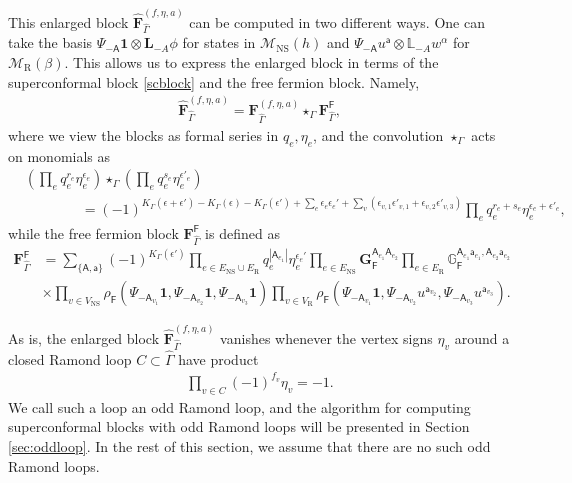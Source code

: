 \documentclass[12pt]{article}
\def\ie{\begin{equation}\begin{aligned}}
\def\fe{\end{aligned}\end{equation}}
\def\NS{\mathrm{NS}}
\def\R{\mathrm{R}}
\def\F{\mathsf{F}}
\begin{document}
This enlarged block $\widehat{\mathbf{F}}^{(f,\eta,a)}_{\hat{\Gamma}}$ can be computed in two different ways. One can take the basis $\Psi_{-\mathsf{A}}\mathbf{1}\otimes \mathbf{L}_{-A}\phi$ for states in $\mathcal{M}_\NS(h)$ and $\Psi_{-\mathsf{A}}u^{\mathsf{a}}\otimes \mathbb{L}_{-A}w^\alpha$ for $\mathcal{M}_{\R}(\beta)$. This allows us to express the enlarged block in terms of the superconformal block \eqref{scblock} and the free fermion block. Namely,
\ie \label{FconvF}
\widehat{\mathbf{F}}_{\hat{\Gamma}}^{(f,\eta,a)} = \mathbf{F}_{\hat{\Gamma}}^{(f,\eta,a)} \star_{{\Gamma}} \mathbf{F}^{\mathsf{F}}_{\hat{\Gamma}},
\fe
where we view the blocks as formal series in $q_e, \eta_e$, and the convolution $\star_{{\Gamma}}$ acts on monomials as
\ie \label{conv}
&\left(\prod_e q_e^{r_e}\eta_e^{\epsilon_e}\right)\star_{{\Gamma}}\left(\prod_e q_e^{s_e}\eta_e^{\epsilon'_e}\right)\\
&\qquad \qquad = (-1)^{K_\Gamma(\epsilon+\epsilon')-K_\Gamma(\epsilon)-K_\Gamma(\epsilon')+\sum_e\epsilon_e \epsilon_e'+\sum_v(\epsilon_{v,1}\epsilon'_{v,1}+\epsilon_{v,2}\epsilon'_{v,3})}
 \prod_e q_e^{r_e+s_e}\eta_e^{\epsilon_e+\epsilon'_e},
\fe
while the free fermion block $\mathbf{F}^{\mathsf{F}}_{\hat{\Gamma}}$ is defined as
\ie
\mathbf{F}^{\mathsf{F}}_{\hat{\Gamma}} &= \sum_{\{\mathsf{A,a}\}} (-1)^{K_\Gamma(\epsilon')} \prod_{e\in E_\NS\cup E_\R} q_e^{|\mathsf{A}_{e_1}|}\eta_e^{\epsilon_e'}\prod_{e\in E_{\NS}}\mathbf{G}_{\F}^{\mathsf{A}_{e_1}\mathsf{A}_{e_2}}\prod_{e\in E_{\R}}\mathbb{G}_{\F}^{\mathsf{A}_{e_1}\mathsf{a}_{e_1},\mathsf{A}_{e_2}\mathsf{a}_{e_2}}\\
&\times \prod_{v\in V_\NS} \rho_{\mathsf{F}}(\Psi_{-\mathsf{A}_{v_1}}\mathbf{1},\Psi_{-\mathsf{A}_{v_2}}\mathbf{1},\Psi_{-\mathsf{A}_{v_3}}\mathbf{1})\prod_{v\in V_\R} \rho_{\mathsf{F}}(\Psi_{-\mathsf{A}_{v_1}}\mathbf{1},\Psi_{-\mathsf{A}_{v_2}}u^{\mathsf{a}_{v_2}},\Psi_{-\mathsf{A}_{v_3}}u^{\mathsf{a}_{v_3}}).
\fe

As is, the enlarged block $\hat{\mathbf{F}}^{(f,\eta,a)}_{{\hat{\Gamma}}}$ vanishes whenever the vertex signs $\eta_v$ around a closed Ramond loop $C\subset \hat{\Gamma}$ have product
\ie
\prod_{v\in C}(-1)^{f_v}\eta_v = -1.
\fe
We call such a loop an odd Ramond loop, and the algorithm for computing superconformal blocks with odd Ramond loops will be presented in Section \ref{sec:oddloop}. In the rest of this section, we assume that there are no such odd Ramond loops.
\end{document}
